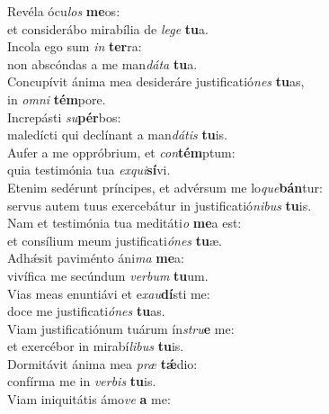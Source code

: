 \evenverse Revéla ócu\textit{los} \textbf{me}os:~\*\\
\evenverse et considerábo mirabília de \textit{le}\textit{ge} \textbf{tu}a.\\
\oddverse Incola ego sum \textit{in} \textbf{ter}ra:~\*\\
\oddverse non abscóndas a me man\textit{dá}\textit{ta} \textbf{tu}a.\\
\evenverse Concupívit ánima mea desideráre justificatió\textit{nes} \textbf{tu}as,~\*\\
\evenverse in \textit{om}\textit{ni} \textbf{tém}pore.\\
\oddverse Increpásti \textit{su}\textbf{pér}bos:~\*\\
\oddverse maledícti qui declínant a man\textit{dá}\textit{tis} \textbf{tu}is.\\
\evenverse Aufer a me oppróbrium, et \textit{con}\textbf{tém}ptum:~\*\\
\evenverse quia testimónia tua \textit{ex}\textit{qui}\textbf{sí}vi.\\
\oddverse Etenim sedérunt príncipes, et advérsum me lo\textit{que}\textbf{bán}tur:~\*\\
\oddverse servus autem tuus exercebátur in justificatió\textit{ni}\textit{bus} \textbf{tu}is.\\
\evenverse Nam et testimónia tua meditáti\textit{o} \textbf{me}a est:~\*\\
\evenverse et consílium meum justificati\textit{ó}\textit{nes} \textbf{tu}æ.\\
\oddverse Adhǽsit paviménto áni\textit{ma} \textbf{me}a:~\*\\
\oddverse vivífica me secúndum \textit{ver}\textit{bum} \textbf{tu}um.\\
\evenverse Vias meas enuntiávi et e\textit{xau}\textbf{dí}sti me:~\*\\
\evenverse doce me justificati\textit{ó}\textit{nes} \textbf{tu}as.\\
\oddverse Viam justificatiónum tuárum ín\textit{stru}\textbf{e} me:~\*\\
\oddverse et exercébor in mirabí\textit{li}\textit{bus} \textbf{tu}is.\\
\evenverse Dormitávit ánima mea \textit{præ} \textbf{tǽ}dio:~\*\\
\evenverse confírma me in \textit{ver}\textit{bis} \textbf{tu}is.\\
\oddverse Viam iniquitátis ámo\textit{ve} \textbf{a} me:~\*\\
